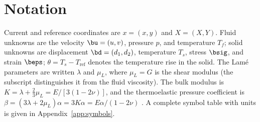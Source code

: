 \section{Notation}
Current and reference coordinates are $x=(x,y)$ and $X=(X,Y)$. Fluid unknowns are the velocity
$\bu=(u,v)$, pressure $p$, and temperature $T_f$; solid unknowns are displacement
$\bd=(d_1,d_2)$, temperature $T_s$, stress $\bsig$, and strain $\beps$;
$\theta=T_s-T_{\mathrm{ref}}$ denotes the temperature rise in the solid. The Lam\'e parameters are
written $\lambda$ and $\mu_L$, where $\mu_L=G$ is the shear modulus (the subscript distinguishes it
from the fluid viscosity). The bulk modulus is $K=\lambda+\tfrac23\mu_L=E/[3(1-2\nu)]$, and the
thermoelastic pressure coefficient is
$\beta=(3\lambda+2\mu_L)\alpha=3K\alpha=E\alpha/(1-2\nu)$
\cite{boley1960theory}. A complete symbol table with units is given in Appendix~\ref{app:symbols}.

